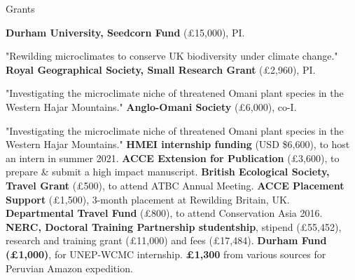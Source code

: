\begin{rubric}{Grants}

\entry*[2023] \textbf{Durham University, Seedcorn Fund} (£15,000), PI.
	\par \footnotesize "Rewilding microclimates to conserve UK biodiversity under climate change." \normalsize
\entry*[2022] \textbf{Royal Geographical Society, Small Research Grant} (£2,960), PI.
	\par \footnotesize "Investigating the microclimate niche of threatened Omani plant species in the Western Hajar Mountains." \normalsize
\entry*[2022] \textbf{Anglo-Omani Society} (£6,000), co-I.
	\par \footnotesize "Investigating the microclimate niche of threatened Omani plant species in the Western Hajar Mountains." \normalsize
\entry*[2021] \textbf{HMEI internship funding} (USD \$6,600), to host an intern in summer 2021.
\entry*[2018] \textbf{ACCE Extension for Publication} (£3,600), to prepare \& submit a high impact manuscript.
\entry*[2018] \textbf{British Ecological Society, Travel Grant} (£500), to attend ATBC Annual Meeting.
\entry*[2016] \textbf{ACCE Placement Support} (£1,500), 3-month placement at Rewilding Britain, UK.
\entry*[2016] \textbf{Departmental Travel Fund} (£800), to attend Conservation Asia 2016.
\entry*[2014] \textbf{NERC, Doctoral Training Partnership studentship}, stipend (£55,452), research and training grant (£11,000) and fees (£17,484).
\entry*[2013] \textbf{Durham Fund (£1,000)}, for UNEP-WCMC internship.
\entry*[2011] \textbf{£1,300} from various sources for Peruvian Amazon expedition.

%



\end{rubric}
